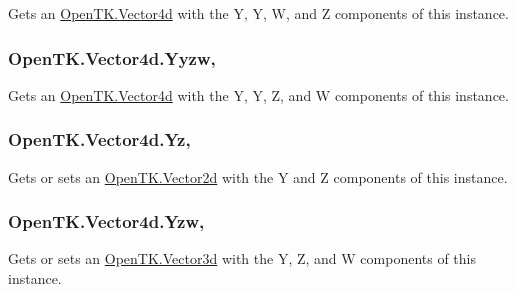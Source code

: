 Gets an \hyperlink{struct_open_t_k_1_1_vector4d}{Open\-T\-K.\-Vector4d} with the Y, Y, W, and Z components of this instance. 

\hypertarget{struct_open_t_k_1_1_vector4d_a577be77e6fc22221f6b7244ffd00db6a}{
\subsubsection[{Yyzw}]{ Open\-T\-K.\-Vector4d.\-Yyzw\hspace{0.3cm}{\ttfamily [get]}, {\ttfamily [set]}}}\label{struct_open_t_k_1_1_vector4d_a577be77e6fc22221f6b7244ffd00db6a}


Gets an \hyperlink{struct_open_t_k_1_1_vector4d}{Open\-T\-K.\-Vector4d} with the Y, Y, Z, and W components of this instance. 

\hypertarget{struct_open_t_k_1_1_vector4d_aa91df7bb24a70c567bc157fd98c54b96}{
\subsubsection[{Yz}]{ Open\-T\-K.\-Vector4d.\-Yz\hspace{0.3cm}{\ttfamily [get]}, {\ttfamily [set]}}}\label{struct_open_t_k_1_1_vector4d_aa91df7bb24a70c567bc157fd98c54b96}


Gets or sets an \hyperlink{struct_open_t_k_1_1_vector2d}{Open\-T\-K.\-Vector2d} with the Y and Z components of this instance. 

\hypertarget{struct_open_t_k_1_1_vector4d_aa26f2964b337aa6fb8b3cd76c7f228be}{
\subsubsection[{Yzw}]{ Open\-T\-K.\-Vector4d.\-Yzw\hspace{0.3cm}{\ttfamily [get]}, {\ttfamily [set]}}}\label{struct_open_t_k_1_1_vector4d_aa26f2964b337aa6fb8b3cd76c7f228be}


Gets or sets an \hyperlink{struct_open_t_k_1_1_vector3d}{Open\-T\-K.\-Vector3d} with the Y, Z, and W components of this instance. 

